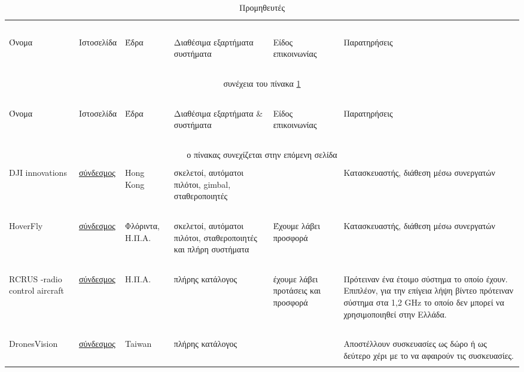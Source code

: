 \documentclass[a4paper, 12pt, twoside]{report}
\begin{document}
		
		\begin{landscape}
		\setlength\LTleft{0pt}            %
		\setlength\LTright{0pt}           %
	
		\begin{longtable}{ m{2cm} m{2cm} m{2cm} m{4cm} m{4cm} m{4cm} }
			\caption [Προμηθευτές]{Προμηθευτές}
			\label{πιν.:Προμηθευτές}\\
				\hline
				~\\
				Όνομα & Ιστοσελίδα & Έδρα & Διαθέσιμα εξαρτήματα συστήματα & Είδος επικοινωνίας & Παρατηρήσεις\\
				\hline
				~\\
			\endfirsthead
				\multicolumn{6}{c}{συνέχεια του πίνακα \ref{πιν.:Προμηθευτές}}\\
				\hline
				~\\
				Όνομα & Ιστοσελίδα & Έδρα & Διαθέσιμα εξαρτήματα \& συστήματα & Είδος επικοινωνίας & Παρατηρήσεις\\
				\hline
				~\\
			\endhead
				\hline
				\multicolumn{6}{c}{ο πίνακας συνεχίζεται στην επόμενη σελίδα}\\
			\endfoot
				\multicolumn{6}{c}{ολοκληρώθηκε ο πίνακας \ref{πιν.:Προμηθευτές}}\\
			\endlastfoot
				DJI innovations & \href{http://www.dji-innovations.com/}{σύνδεσμος} & Hong Kong & σκελετοί, αυτόματοι πιλότοι, gimbal, σταθεροποιητές & & Κατασκευαστής, διάθεση μέσω συνεργατών\\
				\hdashline
				~\\
				HoverFly & \href{http://www.hoverflytech.com/}{σύνδεσμος} & Φλόριντα, Η.Π.Α. & σκελετοί, αυτόματοι πιλότοι, σταθεροποιητές και πλήρη συστήματα & Έχουμε λάβει προσφορά & Κατασκευαστής, διάθεση μέσω συνεργατών\\
				\hdashline
				~\\
				RCRUS -radio control aircraft & \href{http://www.rcrus.com/}{σύνδεσμος} & Η.Π.Α. & πλήρης κατάλογος & έχουμε λάβει προτάσεις και προσφορά & Πρότειναν ένα έτοιμο σύστημα το οποίο έχουν. Επιπλέον, για την επίγεια λήψη βίντεο πρότειναν σύστημα στα 1,2 GHz το οποίο δεν μπορεί να χρησιμοποιηθεί στην Ελλάδα. \\
				\hdashline
				~\\
				DronesVision & \href{http://www.dronesvision.com/}{σύνδεσμος} & Taiwan &  πλήρης κατάλογος & & Αποστέλλουν συσκευασίες ως δώρο ή ως δεύτερο χέρι με το να αφαιρούν τις συσκευασίες. \\
				\hdashline

\end{longtable}
\end{landscape}
\end{document}
